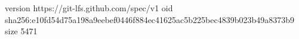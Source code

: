 version https://git-lfs.github.com/spec/v1
oid sha256:e10fd54d75a198a9eebef0446f884ec41625ac5b225bec4839b023b49a8373b9
size 5471
